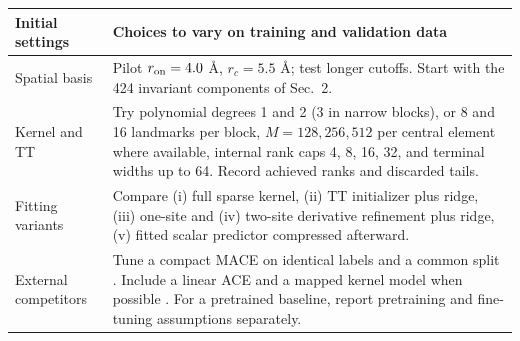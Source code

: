 \documentclass[11pt,a4paper]{article}
\begin{document}
\begin{center}\small
\begin{tabularx}{\linewidth}{@{}p{34mm}X@{}}\toprule
Initial settings & Choices to vary on training and validation data\\\midrule
Spatial basis & Pilot $r_{\rm on}=4.0$ \AA, $r_c=5.5$ \AA; test longer cutoffs. Start with the 424 invariant components of Sec.~2.\\
Kernel and TT & Try polynomial degrees 1 and 2 (3 in narrow blocks), or 8 and 16 landmarks per block, $M=128,256,512$ per central element where available, internal rank caps 4, 8, 16, 32, and terminal widths up to 64. Record achieved ranks and discarded tails.\\
Fitting variants & Compare (i) full sparse kernel, (ii) TT initializer plus ridge, (iii) one-site and (iv) two-site derivative refinement plus ridge, (v) fitted scalar predictor compressed afterward.\\
External competitors & Tune a compact MACE on identical labels and a common split \cite{maceoff}. Include a linear ACE and a mapped kernel model when possible \cite{ace,flare}. For a pretrained baseline, report pretraining and fine-tuning assumptions separately.\\\bottomrule
\end{tabularx}
\end{center}
\end{document}

